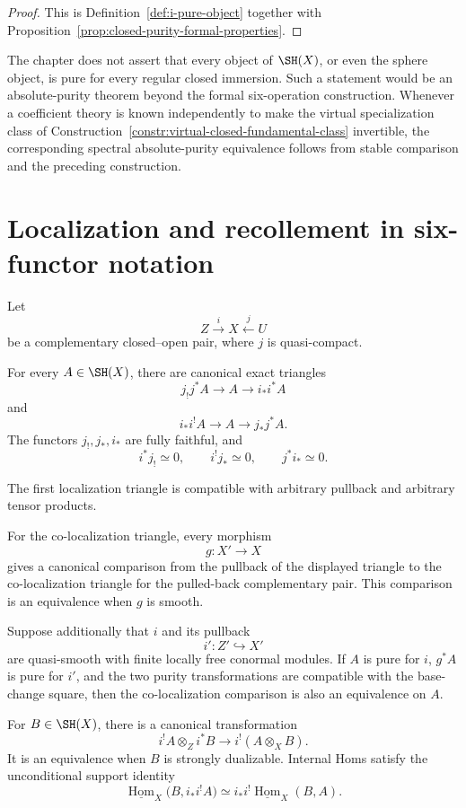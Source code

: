 \begin{proof}
This is Definition~\ref{def:i-pure-object} together with
Proposition~\ref{prop:closed-purity-formal-properties}.
\end{proof}

\begin{remark}
\label{rem:no-integral-absolute-purity}
The chapter does not assert that every object of \(\SH(X)\), or even the
sphere object, is pure for every regular closed immersion.  Such a statement
would be an absolute-purity theorem beyond the formal six-operation
construction.  Whenever a coefficient theory is known independently to
make the virtual specialization class of
Construction~\ref{constr:virtual-closed-fundamental-class} invertible, the
corresponding spectral absolute-purity equivalence follows from stable
comparison and the preceding construction.
\end{remark}


\section{Localization and recollement in six-functor notation}
\label{sec:six-localization}

Let
\[
    Z\xrightarrow{i}X\xleftarrow{j}U
\]
be a complementary closed--open pair, where \(j\) is quasi-compact.

\begin{theorem}
\label{thm:six-functor-localization}
For every \(A\in\SH(X)\), there are canonical exact triangles
\[
    j_!j^*A
    \longrightarrow
    A
    \longrightarrow
    i_*i^*A
\]
and
\[
    i_*i^!A
    \longrightarrow
    A
    \longrightarrow
    j_*j^*A.
\]
The functors \(j_!,j_*,i_*\) are fully faithful, and
\[
    i^*j_!\simeq0,
    \qquad
    i^!j_*\simeq0,
    \qquad
    j^*i_*\simeq0.
\]

The first localization triangle is compatible with arbitrary pullback and
arbitrary tensor products.

For the co-localization triangle, every morphism
\[
    g:X'\longrightarrow X
\]
gives a canonical comparison from the pullback of the displayed triangle
to the co-localization triangle for the pulled-back complementary pair.
This comparison is an equivalence when \(g\) is smooth.

Suppose additionally that \(i\) and its pullback
\[
    i':Z'\hookrightarrow X'
\]
are quasi-smooth with finite locally free conormal modules.  If \(A\) is
pure for \(i\), \(g^*A\) is pure for \(i'\), and the two purity
transformations are compatible with the base-change square, then the
co-localization comparison is also an equivalence on \(A\).

For \(B\in\SH(X)\), there is a canonical transformation
\[
    i^!A\otimes_Zi^*B
    \longrightarrow
    i^!(A\otimes_XB).
\]
It is an equivalence when \(B\) is strongly dualizable.  Internal Homs
satisfy the unconditional support identity
\[
    \underline{\operatorname{Hom}}_X
    \bigl(
      B,
      i_*i^!A
    \bigr)
    \simeq
    i_*i^!
    \underline{\operatorname{Hom}}_X(B,A).
\]
\end{theorem}

